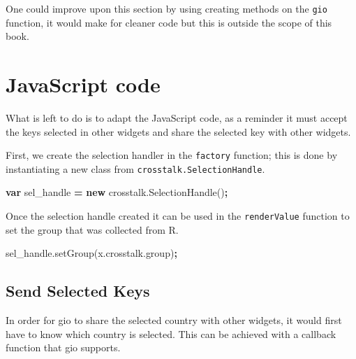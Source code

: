 \documentclass[
]{krantz}
\makeatletter
\newenvironment{Shaded}{\begin{snugshade}}{\end{snugshade}}
\newcommand{\AttributeTok}[1]{\textcolor[rgb]{0.61,0.61,0.61}{#1}}
\newcommand{\KeywordTok}[1]{\textcolor[rgb]{0.27,0.27,0.27}{\textbf{#1}}}
\newcommand{\NormalTok}[1]{#1}
\newcommand{\OperatorTok}[1]{\textcolor[rgb]{0.43,0.43,0.43}{\textbf{#1}}}
\newcommand{\VariableTok}[1]{\textcolor[rgb]{0,0,0}{#1}}
\newenvironment{kframe}{%
\medskip{}
\setlength{\fboxsep}{.8em}
 \def\at@end@of@kframe{}%
 \ifinner\ifhmode%
  \def\at@end@of@kframe{\end{minipage}}%
  \begin{minipage}{\columnwidth}%
 \fi\fi%
 \def\FrameCommand##1{\hskip\@totalleftmargin \hskip-\fboxsep
 \colorbox{shadecolor}{##1}\hskip-\fboxsep
     \hskip-\linewidth \hskip-\@totalleftmargin \hskip\columnwidth}%
 \MakeFramed {\advance\hsize-\width
   \@totalleftmargin\z@ \linewidth\hsize
   \@setminipage}}%
 {\par\unskip\endMakeFramed%
 \at@end@of@kframe}
\renewenvironment{Shaded}{\begin{kframe}}{\end{kframe}}
\newenvironment{rmdblock}[1]
  {
  \begin{itemize}
  \renewcommand{\labelitemi}{
    \raisebox{-.7\height}[0pt][0pt]{
      {\setkeys{Gin}{width=3em,keepaspectratio}\texttt{[image: images/\#1]}}
    }
  }
  \setlength{\fboxsep}{1em}
  \begin{kframe}
  \item
  }
  {
  \end{kframe}
  \end{itemize}
  }
\newenvironment{rmdnote}
  {\begin{rmdblock}{note}}
  {\end{rmdblock}}
\makeatother
\begin{document}
\begin{rmdnote}
One could improve upon this section by using creating methods on the
\texttt{gio} function, it would make for cleaner code but this is
outside the scope of this book.
\end{rmdnote}

\hypertarget{linking-widgets-js}{%
\section{JavaScript code}\label{linking-widgets-js}}

What is left to do is to adapt the JavaScript code, as a reminder it must accept the keys selected in other widgets and share the selected key with other widgets.

First, we create the selection handler in the \texttt{factory} function; this is done by instantiating a new class from \texttt{crosstalk.SelectionHandle}.

\begin{Shaded}
\begin{Highlighting}[]
\KeywordTok{var}\NormalTok{ sel\_handle }\OperatorTok{=} \KeywordTok{new} \VariableTok{crosstalk}\NormalTok{.}\AttributeTok{SelectionHandle}\NormalTok{()}\OperatorTok{;}
\end{Highlighting}
\end{Shaded}

Once the selection handle created it can be used in the \texttt{renderValue} function to set the group that was collected from R.

\begin{Shaded}
\begin{Highlighting}[]
\VariableTok{sel\_handle}\NormalTok{.}\AttributeTok{setGroup}\NormalTok{(}\VariableTok{x}\NormalTok{.}\VariableTok{crosstalk}\NormalTok{.}\AttributeTok{group}\NormalTok{)}\OperatorTok{;}
\end{Highlighting}
\end{Shaded}

\hypertarget{linking-widgets-send-keys}{%
\subsection{Send Selected Keys}\label{linking-widgets-send-keys}}

In order for gio to share the selected country with other widgets, it would first have to know which country is selected. This can be achieved with a callback function that gio supports.
\end{document}
